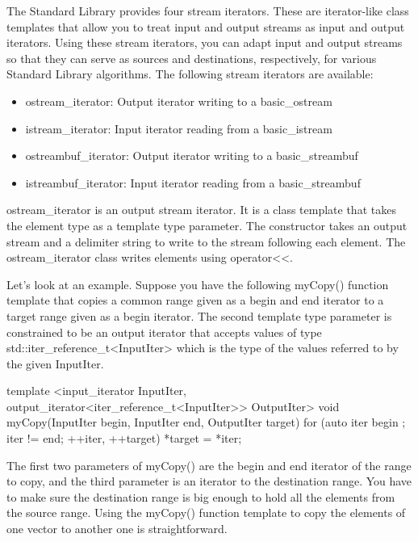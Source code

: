 
The Standard Library provides four stream iterators. These are iterator-like class templates that allow you to treat input and output streams as input and output iterators. Using these stream iterators, you can adapt input and output streams so that they can serve as sources and destinations, respectively, for various Standard Library algorithms. The following stream iterators are available:

\begin{itemize}
\item
ostream\_iterator: Output iterator writing to a basic\_ostream

\item
istream\_iterator: Input iterator reading from a basic\_istream

\item
ostreambuf\_iterator: Output iterator writing to a basic\_streambuf

\item
istreambuf\_iterator: Input iterator reading from a basic\_streambuf
\end{itemize}


ostream\_iterator is an output stream iterator. It is a class template that takes the element type as a template type parameter. The constructor takes an output stream and a delimiter string to write to the stream following each element. The ostream\_iterator class writes elements using operator<{}<.

Let’s look at an example. Suppose you have the following myCopy() function template that copies a common range given as a begin and end iterator to a target range given as a begin iterator. The second template type parameter is constrained to be an output iterator that accepts values of type std::iter\_reference\_t<InputIter> which is the type of the values referred to by the given InputIter.

\begin{cpp}
template <input_iterator InputIter,
    output_iterator<iter_reference_t<InputIter>> OutputIter>
void myCopy(InputIter begin, InputIter end, OutputIter target)
{
    for (auto iter { begin }; iter != end; ++iter, ++target) { *target = *iter; }
}
\end{cpp}

The first two parameters of myCopy() are the begin and end iterator of the range to copy, and the third parameter is an iterator to the destination range. You have to make sure the destination range is big enough to hold all the elements from the source range. Using the myCopy() function template to copy the elements of one vector to another one is straightforward.

